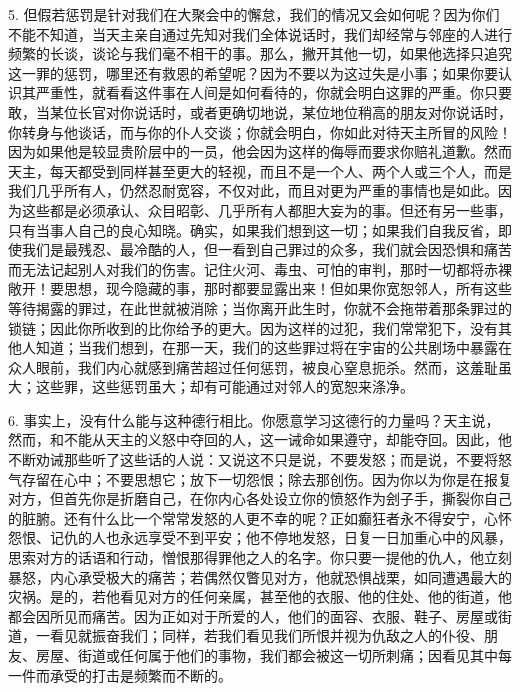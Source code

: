 5. 但假若惩罚是针对我们在大聚会中的懈怠，我们的情况又会如何呢？因为你们不能不知道，当天主亲自通过先知对我们全体说话时，我们却经常与邻座的人进行频繁的长谈，谈论与我们毫不相干的事。那么，撇开其他一切，如果他选择只追究这一罪的惩罚，哪里还有救恩的希望呢？因为不要以为这过失是小事；如果你要认识其严重性，就看看这件事在人间是如何看待的，你就会明白这罪的严重。你只要敢，当某位长官对你说话时，或者更确切地说，某位地位稍高的朋友对你说话时，你转身与他谈话，而与你的仆人交谈；你就会明白，你如此对待天主所冒的风险！因为如果他是较显贵阶层中的一员，他会因为这样的侮辱而要求你赔礼道歉。然而天主，每天都受到同样甚至更大的轻视，而且不是一个人、两个人或三个人，而是我们几乎所有人，仍然忍耐宽容，不仅对此，而且对更为严重的事情也是如此。因为这些都是必须承认、众目昭彰、几乎所有人都胆大妄为的事。但还有另一些事，只有当事人自己的良心知晓。确实，如果我们想到这一切；如果我们自我反省，即使我们是最残忍、最冷酷的人，但一看到自己罪过的众多，我们就会因恐惧和痛苦而无法记起别人对我们的伤害。记住火河、毒虫、可怕的审判，那时一切都将赤裸敞开！要思想，现今隐藏的事，那时都要显露出来！但如果你宽恕邻人，所有这些等待揭露的罪过，在此世就被消除；当你离开此生时，你就不会拖带着那条罪过的锁链；因此你所收到的比你给予的更大。因为这样的过犯，我们常常犯下，没有其他人知道；当我们想到，在那一天，我们的这些罪过将在宇宙的公共剧场中暴露在众人眼前，我们内心就感到痛苦超过任何惩罚，被良心窒息扼杀。然而，这羞耻虽大；这些罪，这些惩罚虽大；却有可能通过对邻人的宽恕来涤净。\par

6. 事实上，没有什么能与这种德行相比。你愿意学习这德行的力量吗？天主说， 然而，和不能从天主的义怒中夺回的人，这一诫命如果遵守，却能夺回。因此，他不断劝诫那些听了这些话的人说：又说这不只是说，不要发怒；而是说，不要将怒气存留在心中；不要思想它；放下一切怨恨；除去那创伤。因为你以为你是在报复对方，但首先你是折磨自己，在你内心各处设立你的愤怒作为刽子手，撕裂你自己的脏腑。还有什么比一个常常发怒的人更不幸的呢？正如癫狂者永不得安宁，心怀怨恨、记仇的人也永远享受不到平安；他不停地发怒，日复一日加重心中的风暴，思索对方的话语和行动，憎恨那得罪他之人的名字。你只要一提他的仇人，他立刻暴怒，内心承受极大的痛苦；若偶然仅瞥见对方，他就恐惧战栗，如同遭遇最大的灾祸。是的，若他看见对方的任何亲属，甚至他的衣服、他的住处、他的街道，他都会因所见而痛苦。因为正如对于所爱的人，他们的面容、衣服、鞋子、房屋或街道，一看见就振奋我们；同样，若我们看见我们所恨并视为仇敌之人的仆役、朋友、房屋、街道或任何属于他们的事物，我们都会被这一切所刺痛；因看见其中每一件而承受的打击是频繁而不断的。\par

